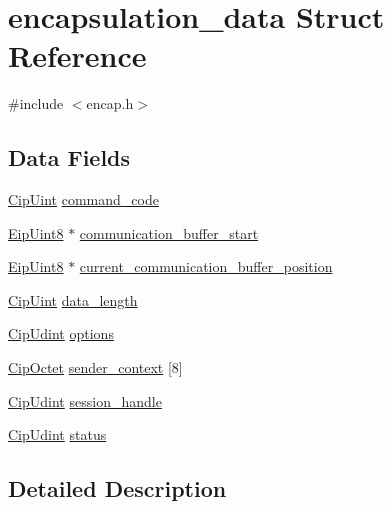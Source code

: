\hypertarget{structencapsulation__data}{\section{encapsulation\-\_\-data \-Struct \-Reference}
\label{d9/d42/structencapsulation__data}
}


{\ttfamily \#include $<$encap.\-h$>$}

\subsection*{\-Data \-Fields}
\begin{DoxyCompactItemize}
\item 
\hyperlink{typedefs_8h_a72c0fba927c5681c44dbf59147578fc7}{\-Cip\-Uint} \hyperlink{structencapsulation__data_a502e32a96117d89036030eb537f67972}{command\-\_\-code}
\item 
\hyperlink{typedefs_8h_aa0c108ee762a27720919a4634643040e}{\-Eip\-Uint8} $\ast$ \hyperlink{structencapsulation__data_a7cfd7e35e8eb9960ca8215d2ddc59f70}{communication\-\_\-buffer\-\_\-start}
\item 
\hyperlink{typedefs_8h_aa0c108ee762a27720919a4634643040e}{\-Eip\-Uint8} $\ast$ \hyperlink{structencapsulation__data_aea1f797ee9ab44d96af2ed76c65c7e5b}{current\-\_\-communication\-\_\-buffer\-\_\-position}
\item 
\hyperlink{typedefs_8h_a72c0fba927c5681c44dbf59147578fc7}{\-Cip\-Uint} \hyperlink{structencapsulation__data_a35e50f3e90d29bec932121aa92e08f63}{data\-\_\-length}
\item 
\hyperlink{typedefs_8h_aa6230aff6a173bcb6dc949ac85c2e7f1}{\-Cip\-Udint} \hyperlink{structencapsulation__data_a09f1929110e91e6dc506b23eede7900a}{options}
\item 
\hyperlink{typedefs_8h_ab1d6828b2df519496de8762b3ffd54b1}{\-Cip\-Octet} \hyperlink{structencapsulation__data_a8eb70ef3d00610457050d85ad1b13b75}{sender\-\_\-context} \mbox{[}8\mbox{]}
\item 
\hyperlink{typedefs_8h_aa6230aff6a173bcb6dc949ac85c2e7f1}{\-Cip\-Udint} \hyperlink{structencapsulation__data_ab67e9ddf3cb33c0e5246e82b3c1a6fa9}{session\-\_\-handle}
\item 
\hyperlink{typedefs_8h_aa6230aff6a173bcb6dc949ac85c2e7f1}{\-Cip\-Udint} \hyperlink{structencapsulation__data_ae9d36e698eb09d2248f8856da0281f5c}{status}
\end{DoxyCompactItemize}


\subsection{\-Detailed \-Description}


